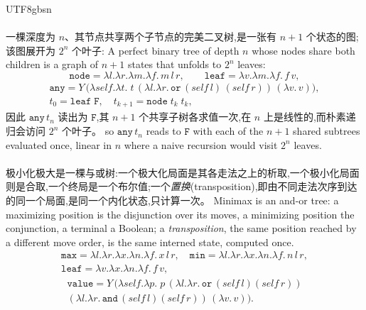 \begin{CJK*}{UTF8}{gbsn}
  \paragraph{}
  \ifPaperChinese 一棵深度为 $n$、其节点共享两个子节点的完美二叉树,是一张有 $n+1$ 个状态的图;该图展开为 $2^{n}$ 个叶子: \else A perfect binary tree of depth $n$ whose nodes share both children is a graph of $n+1$ states that unfolds to $2^{n}$ leaves: \fi
  \[
    \mathtt{node} = \lambda l.\lambda r.\lambda m.\lambda f.\,m\,l\,r, \qquad
    \mathtt{leaf} = \lambda v.\lambda m.\lambda f.\,f\,v,
  \]
  \begin{gather*}
    \mathtt{any} = Y\,\big(\lambda\mathit{self}.\lambda t.\;
    t\,(\lambda l.\lambda r.\,\mathtt{or}\,(\mathit{self}\,l)\,(\mathit{self}\,r))\,(\lambda v.\,v)\big),\\
    t_0 = \mathtt{leaf}\;\mathtt{F},\quad t_{k+1} = \mathtt{node}\;t_k\;t_k,
  \end{gather*}
  \ifPaperChinese 因此 $\mathtt{any}\,t_n$ 读出为 $\mathtt{F}$,其 $n+1$ 个共享子树各求值一次,在 $n$ 上是线性的,而朴素递归会访问 $2^{n}$ 个叶子。 \else so $\mathtt{any}\,t_n$ reads to $\mathtt{F}$ with each of the $n+1$ shared subtrees evaluated once, linear in $n$ where a naive recursion would visit $2^{n}$ leaves. \fi

  \paragraph{}
  \ifPaperChinese
  极小化极大是一棵与或树:一个极大化局面是其各走法之上的析取,一个极小化局面则是合取,一个终局是一个布尔值;一个\emph{置换}(transposition),即由不同走法次序到达的同一个局面,是同一个内化状态,只计算一次。
  \else
  Minimax is an and-or tree: a maximizing position is the disjunction over its moves, a minimizing position the conjunction, a terminal a Boolean; a \emph{transposition}, the same position reached by a different move order, is the same interned state, computed once.
  \fi
  \begin{gather*}
    \mathtt{max} = \lambda l.\lambda r.\lambda x.\lambda n.\lambda f.\,x\,l\,r, \quad
    \mathtt{min} = \lambda l.\lambda r.\lambda x.\lambda n.\lambda f.\,n\,l\,r,\\
    \mathtt{leaf} = \lambda v.\lambda x.\lambda n.\lambda f.\,f\,v,
  \end{gather*}
  \begin{multline*}
    \mathtt{value} = Y\,\big(\lambda\mathit{self}.\lambda p.\;
      p\,(\lambda l.\lambda r.\,\mathtt{or}\,(\mathit{self}\,l)(\mathit{self}\,r))\\
    (\lambda l.\lambda r.\,\mathtt{and}\,(\mathit{self}\,l)(\mathit{self}\,r))\,(\lambda v.\,v)\big).
  \end{multline*}


\end{CJK*}
